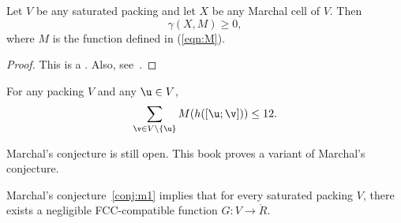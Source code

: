 \begin{theorem}\label{lemma:MI} 
Let $V$ be any saturated packing and let $X$ be any Marchal cell of $V$.  Then
\begin{equation}\label{eqn:mfe} 
\gamma(X,M)\ge 0,
\end{equation}
where $M$ is the function defined in (\ref{eqn:M}).
\end{theorem}

\begin{proof}  This is a .  
Also, see~\cite{marchal:2009}.  
\end{proof}


\begin{conjecture}[Marchal]\label{conj:m1} 
For any packing $ V$ and
any $ \u\in V$,
\[  
\sum_{\v\in V\setminus\{\u\}} M(h([\u;\v])) \le 12.
\] 
\end{conjecture}

Marchal's conjecture is still open.  This book proves a variant of
Marchal's conjecture.

\begin{theorem}\label{theorem:mk1} 
Marchal's conjecture~\ref{conj:m1} implies
that for every saturated packing $V$, there exists a negligible FCC-compatible function
$G:V\to \ring{R}$.
\end{theorem}



